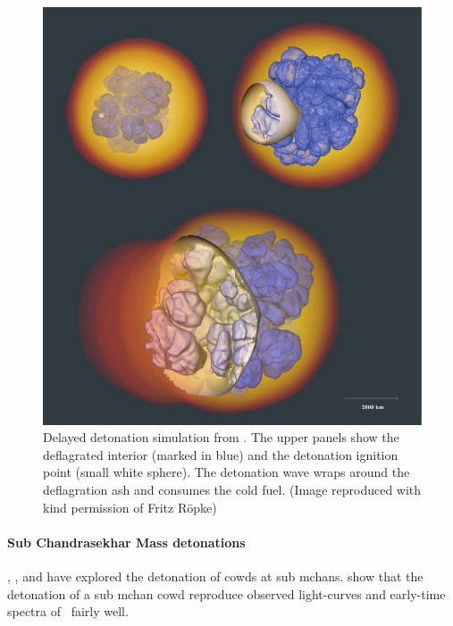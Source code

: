 \begin{figure}[tb] %
   \centering
   \includegraphics[width=1\textwidth]{chapter_intro/plots/ddt_roepke08.pdf}
   \caption[Delayed detonation simulation from \citet{2008NJPh...10l5009R}]{Delayed detonation simulation from \citet{2008NJPh...10l5009R}. The upper panels show the deflagrated interior (marked in blue) and the detonation ignition point (small white sphere). The detonation wave wraps around the deflagration ash and consumes the cold fuel. (Image reproduced with kind permission of Fritz R\"{o}pke)}
   \label{fig:snia_ddt_roepke2007}
\end{figure}


\paragraph{Sub Chandrasekhar Mass detonations}
\label{sec:intro:subchandra}
\cite{1990ApJ...354L..53L}, \citet{1992ApJ...386L..13S}, \citet{1995ApJ...452...62L} and \citet{2010ApJ...714L..52S} have explored the detonation of \glspl{cowd} at sub \glspl{mchan}. \citet{2010ApJ...714L..52S} show that the detonation of a sub \gls{mchan} \gls{cowd} reproduce observed light-curves and early-time spectra of \sneia\ fairly well.

